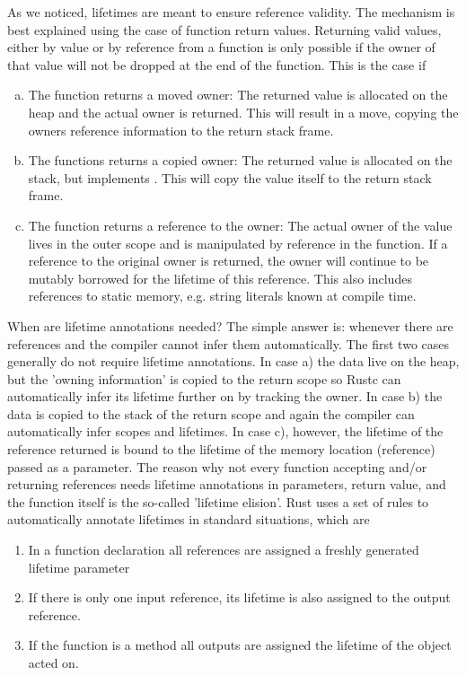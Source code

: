 As we noticed, lifetimes are meant to ensure reference validity. The mechanism is best explained using the case of function return values. Returning valid values, either by value or by reference from a function is only possible if the owner of that value will not be dropped at the end of the function. This is the case if 
\begin{enumerate}[a)]
    \item The function returns a moved owner: The returned value is allocated on the heap and the actual owner is returned. This will result in a move, copying the owners reference information to the return stack frame.
    \item The functions returns a copied owner: The returned value is allocated on the stack, but implements . This will copy the value itself to the return stack frame.
    \item The function returns a reference to the owner: The actual owner of the value lives in the outer scope and is manipulated by reference in the function. If a reference to the original owner is returned, the owner will continue to be mutably borrowed for the lifetime of this reference. This also includes references to static memory, e.g. string literals known at compile time. 
\end{enumerate}

When are lifetime annotations needed? The simple answer is: whenever there are references and the compiler cannot infer them automatically. The first two cases generally do not require lifetime annotations. In case a) the data live on the heap, but the 'owning information' is copied to the return scope so Rustc can automatically infer its lifetime further on by tracking the owner. In case b) the data is copied to the stack of the return scope and again the compiler can automatically infer scopes and lifetimes. In case c), however, the lifetime of the reference returned is bound to the lifetime of the memory location (reference) passed as a parameter. The reason why not every function accepting and/or returning references needs lifetime annotations in parameters, return value, and the function itself is the so-called 'lifetime elision'. Rust uses a set of rules to automatically annotate lifetimes in standard situations, which are
\begin{enumerate}
    \item In a function declaration all references are assigned a freshly generated lifetime parameter\\
    \item If there is only one input reference, its lifetime is also assigned to the output reference.\\
    \item If the function is a method all outputs are assigned the lifetime of the object acted on.\\  
\end{enumerate}

